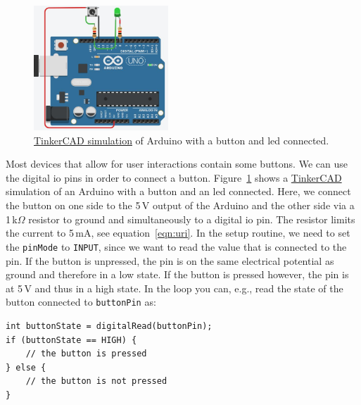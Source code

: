 \begin{figure}[tb]
    \centering
    \includegraphics[width=0.45\textwidth]{graphics/01_blink/arduino_button_led_tinkercad.jpg}
    \caption{\href{https://www.tinkercad.com/things/5VP2mIHUOxB}{TinkerCAD simulation} of Arduino with a button and \ac{led} connected.}
    \label{fig:intro:button_led}
\end{figure}
Most devices that allow for user interactions contain some buttons. We can use the digital \ac{io} pins in order to connect a button. Figure~\ref{fig:intro:button_led} shows a \href{https://www.tinkercad.com}{TinkerCAD} simulation of an Arduino with a button and an \ac{led} connected. Here, we connect the button on one side to the 5\,V output of the Arduino and the other side via a 1\,k$\Omega$ resistor to ground and simultaneously to a digital \ac{io} pin. The resistor limits the current to 5\,mA, see equation~\eqref{eqn:uri}. In the setup routine, we need to set the \lstinline{pinMode} to \lstinline{INPUT}, since we want to read the value that is connected to the pin. If the button is unpressed, the pin is on the same electrical potential as ground and therefore in a low state. If the button is pressed however, the pin is at 5\,V and thus in a high state. In the loop you can, e.g., read the state of the button connected to \lstinline{buttonPin} as:
\begin{lstlisting}
int buttonState = digitalRead(buttonPin);
if (buttonState == HIGH) {
    // the button is pressed
} else {
    // the button is not pressed
}
\end{lstlisting}


